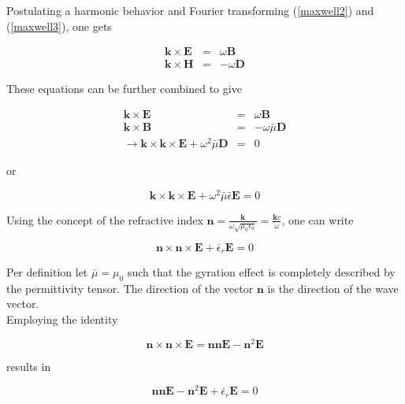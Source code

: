 \documentclass[a4paper,11pt]{thesis}
\begin{document}
Postulating a harmonic behavior and Fourier transforming
(\ref{maxwell2}) and (\ref{maxwell3}), one gets

\begin{eqnarray}
 \mathbf{k} \times \mathbf{E}&=&  \omega \mathbf{B}  \\
 \mathbf{k} \times \mathbf{H}&=& -\omega \mathbf{D}
\end{eqnarray}

These equations can be further combined to give

\begin{eqnarray}
 \mathbf{k} \times \mathbf{E}&=&  \omega \mathbf{B}  \\
 \mathbf{k} \times \mathbf{B}&=& -\omega \bar{\mu}\mathbf{D}\\
\rightarrow \mathbf{k} \times\mathbf{k} \times  \mathbf{E} +
\omega^2 \bar{\mu} \mathbf{D} &=&0
\end{eqnarray}

or

\begin{equation}
    \mathbf{k} \times\mathbf{k} \times  \mathbf{E} + \omega^2 \bar{\mu} \bar{\epsilon}  \mathbf{E} =0
\end{equation}

Using the concept of the refractive index $\mathbf{n}=\frac{\mathbf{k}}{\omega \sqrt{\mu_0
\epsilon_0}}=\frac{\mathbf{k}c}{\omega}$, one can write

\begin{equation}
    \mathbf{n} \times\mathbf{n} \times  \mathbf{E} +  \bar{\epsilon}_r \mathbf{E} =0
\end{equation}


Per definition let $\bar{\mu}=\mu_0$ such that the gyration effect is
completely described by the permittivity
tensor. The direction of the vector $\mathbf{n}$ is the direction of the wave vector.\\

Employing the identity

\begin{equation}
    \mathbf{n} \times \mathbf{n} \times \mathbf{E} = \mathbf{n}\mathbf{n} \mathbf{E}- \mathbf{n}^2 \mathbf{E}
\end{equation}

results in

\begin{equation}
    \mathbf{n}\mathbf{n} \mathbf{E}- \mathbf{n}^2   \mathbf{E} +  \bar{\epsilon}_r  \mathbf{E} =0
\end{equation}
\end{document}
